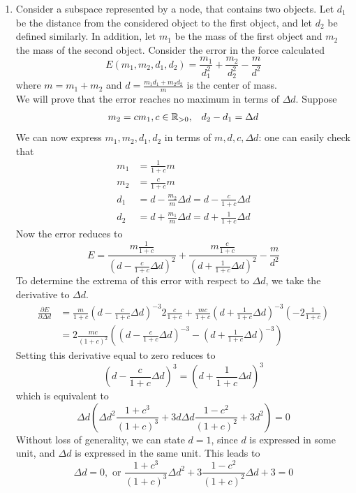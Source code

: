 \begin{enumerate}
\item Consider a subspace represented by a node, that contains two objects. Let $d_1$ be the distance from the considered object to the first object, and let $d_2$ be defined similarly. In addition, let $m_1$ be the mass of the first object and $m_2$ the mass of the second object. Consider the error in the force calculated
\[
E(m_1,m_2,d_1,d_2) = \frac{m_1}{d_1^2}+\frac{m_2}{d_2^2}-\frac{m}{d^2}
\]
where $m = m_1+m_2$ and $d = \frac{m_1d_1+m_2d_2}{m}$ is the center of mass.\\
We will prove that the error reaches no maximum in terms of $\Delta d$. Suppose
\[
\begin{array}{cc}
m_2 = cm_1, c\in \mathbb{R}_{>0}, & d_2-d_1 = \Delta d
\end{array}
\]
We can now express $m_1,m_2,d_1,d_2$ in terms of $m,d,c,\Delta d$: one can easily check that
\begin{align*}
m_1 &= \frac{1}{1+c}m\\
m_2 &= \frac{c}{1+c}m\\
d_1 &= d-\frac{m_2}{m}\Delta d = d-\frac{c}{1+c}\Delta d\\
d_2 &= d+\frac{m_1}{m}\Delta d = d+\frac{1}{1+c}\Delta d
\end{align*}
Now the error reduces to
\[
E = \frac{m\frac{1}{1+c}}{(d-\frac{c}{1+c}\Delta d)^2}+\frac{m\frac{c}{1+c}}{(d+\frac{1}{1+c}\Delta d)^2}-\frac{m}{d^2}
\]
To determine the extrema of this error with respect to $\Delta d$, we take the derivative to $\Delta d$.
\begin{align*}
\frac{\partial E}{\partial \Delta d} &= \frac{m}{1+c}\left(d-\frac{c}{1+c}\Delta d\right)^{-3}2\frac{c}{1+c}+\frac{mc}{1+c}\left(d+\frac{1}{1+c}\Delta d\right)^{-3}\left(-2\frac{1}{1+c}\right)\\
&= 2\frac{mc}{(1+c)^2}\left(\left(d-\frac{c}{1+c}\Delta d\right)^{-3}-\left(d+\frac{1}{1+c}\Delta d\right)^{-3}\right)
\end{align*}
Setting this derivative equal to zero reduces to
\[
\left(d-\frac{c}{1+c}\Delta d\right)^3 = \left(d+\frac{1}{1+c}\Delta d\right)^3
\]
which is equivalent to
\[
\Delta d\left(\Delta d^2\frac{1+c^3}{(1+c)^3}+3d\Delta d\frac{1-c^2}{(1+c)^2}+3d^2\right) = 0
\]
Without loss of generality, we can state $d=1$, since $d$ is expressed in some unit, and $\Delta d$ is expressed in the same unit. This leads to
\begin{equation}
\Delta d = 0, \text{ or } \frac{1+c^3}{(1+c)^3}\Delta d^2+3\frac{1-c^2}{(1+c)^2}\Delta d+3 = 0
\end{equation}

\end{enumerate}
